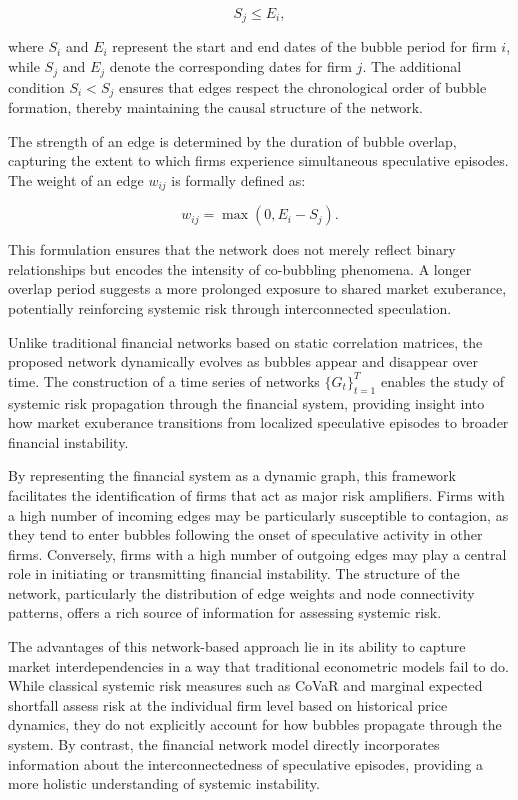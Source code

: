 \documentclass[preprint,12pt,authoryear]{elsarticle}
\begin{document}
\[
S_j \leq E_i,
\]

where \( S_i \) and \( E_i \) represent the start and end dates of the bubble period for firm \( i \), while \( S_j \) and \( E_j \) denote the corresponding dates for firm \( j \). The additional condition \( S_i < S_j \) ensures that edges respect the chronological order of bubble formation, thereby maintaining the causal structure of the network.

The strength of an edge is determined by the duration of bubble overlap, capturing the extent to which firms experience simultaneous speculative episodes. The weight of an edge \( w_{ij} \) is formally defined as:

\[
w_{ij} = \max(0, E_i - S_j).
\]

This formulation ensures that the network does not merely reflect binary relationships but encodes the intensity of co-bubbling phenomena. A longer overlap period suggests a more prolonged exposure to shared market exuberance, potentially reinforcing systemic risk through interconnected speculation.

Unlike traditional financial networks based on static correlation matrices, the proposed network dynamically evolves as bubbles appear and disappear over time. The construction of a time series of networks \( \{ G_t \}_{t=1}^{T} \) enables the study of systemic risk propagation through the financial system, providing insight into how market exuberance transitions from localized speculative episodes to broader financial instability.

By representing the financial system as a dynamic graph, this framework facilitates the identification of firms that act as major risk amplifiers. Firms with a high number of incoming edges may be particularly susceptible to contagion, as they tend to enter bubbles following the onset of speculative activity in other firms. Conversely, firms with a high number of outgoing edges may play a central role in initiating or transmitting financial instability. The structure of the network, particularly the distribution of edge weights and node connectivity patterns, offers a rich source of information for assessing systemic risk.

The advantages of this network-based approach lie in its ability to capture market interdependencies in a way that traditional econometric models fail to do. While classical systemic risk measures such as CoVaR and marginal expected shortfall assess risk at the individual firm level based on historical price dynamics, they do not explicitly account for how bubbles propagate through the system. By contrast, the financial network model directly incorporates information about the interconnectedness of speculative episodes, providing a more holistic understanding of systemic instability.
\end{document}
